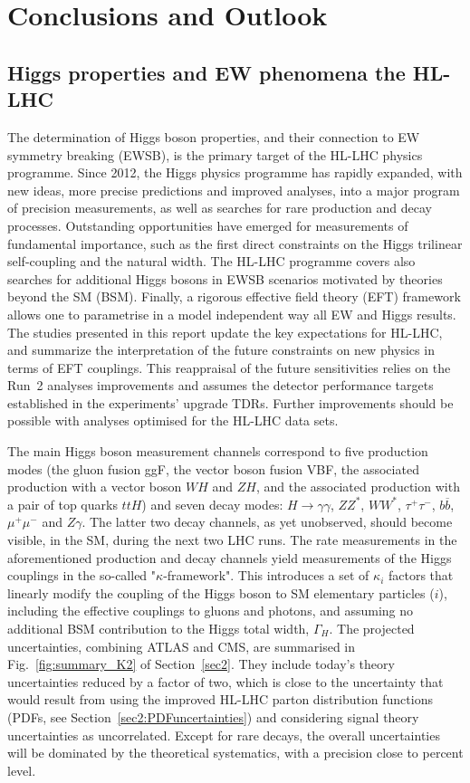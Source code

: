 \documentclass[../report.tex]{subfiles}
\begin{document}
\section{Conclusions and Outlook}
\subsection{Higgs properties and EW phenomena the HL-LHC}
The determination of Higgs boson properties, and their connection to EW symmetry breaking (EWSB), is the primary target of the HL-LHC physics programme. Since 2012, the Higgs physics programme has rapidly expanded, with new ideas, more precise predictions and improved analyses, into a major program of precision measurements, as well as  searches for rare production and decay processes. Outstanding opportunities have emerged for measurements of fundamental importance, such as the first direct constraints on the Higgs trilinear self-coupling and the natural width. The HL-LHC programme covers also searches for additional Higgs bosons in EWSB scenarios motivated by theories beyond the SM (BSM). Finally, a rigorous effective field theory (EFT) framework allows one to parametrise in a model independent way all EW and Higgs results. 
The studies presented in this report update the key expectations for HL-LHC,  and summarize the interpretation of the future constraints on new physics in terms of EFT couplings. This reappraisal of the future sensitivities relies on the Run~2 analyses improvements and assumes the detector performance targets established in the experiments' upgrade TDRs.
Further improvements should be possible with analyses optimised for the HL-LHC data sets.

The main Higgs boson measurement channels correspond to five production modes (the gluon fusion ggF, the vector boson fusion VBF, the associated production with a vector boson $WH$ and $ZH$, and the associated production with a pair of top quarks $ttH$) and seven decay modes: $H \to \gamma\gamma$, $ZZ^*$, $WW^*$, $\tau^+\tau^-$, $b\overline{b}$, $\mu^+\mu^-$ and $Z\gamma$. The latter two decay channels, as yet unobserved, should become visible, in the SM, during the next two LHC runs. 
The rate measurements in the aforementioned production and decay channels yield measurements of the Higgs couplings in the so-called "$\kappa$-framework". This introduces a set of $\kappa_i$ factors that linearly modify the coupling of the Higgs boson to SM elementary particles  ($i$), including the effective couplings to gluons and photons, and assuming no additional BSM contribution to the Higgs total width, $\Gamma_H$. The projected uncertainties, combining ATLAS and CMS, are summarised in Fig.~\ref{fig:summary_K2} of Section~\ref{sec2}. They include today's theory uncertainties reduced by a factor of two, which is close to the uncertainty that would result from using the improved HL-LHC parton distribution functions (PDFs, see Section~\ref{sec2:PDFuncertainties}) and considering signal theory uncertainties as uncorrelated. Except for rare decays, the overall uncertainties will be dominated by the theoretical systematics, with a precision close to percent level.
\end{document}
